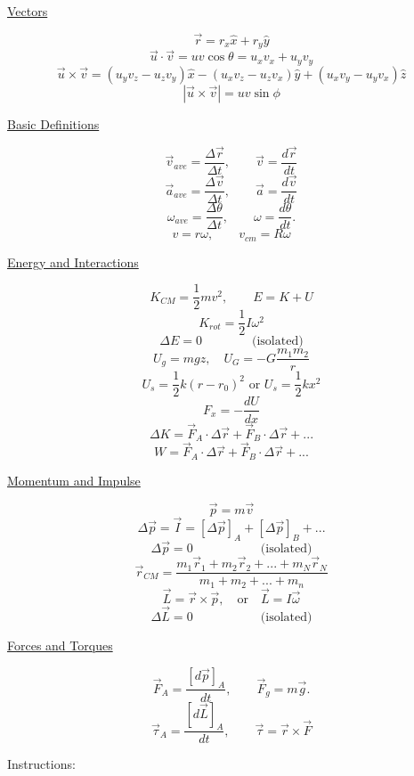 \documentclass[11pt]{exam}
\begin{document}
\begin{minipage}{0.5\textwidth}
  \begin{center}
    \uline{Vectors}
  \end{center}
  \[\vec{r}=r_x\hat{x}+r_y\hat{y}\]
  \[\vec{u}\cdot\vec{v}=uv\cos\theta=u_xv_x+u_yv_y\]
  \[\vec{u}\times\vec{v}=(u_yv_z-u_zv_y)\hat{x}-(u_xv_z-u_zv_x)\hat{y}+(u_xv_y-u_yv_x)\hat{z}\]
  \[|\vec{u}\times \vec{v}|=uv\sin\phi\]
\begin{center}
    \uline{Basic Definitions}
\end{center}
\[\vec{v}_{ave}=\frac{\Delta \vec{r}}{\Delta t},\qquad \vec{v}=\frac{d\vec{r}}{dt}\]
\[\vec{a}_{ave}=\frac{\Delta \vec{v}}{\Delta t},\qquad \vec{a}=\frac{d\vec{v}}{dt}\]
\[\omega_{ave}=\frac{\Delta \theta}{\Delta t},\qquad \omega=\frac{d\theta}{dt}.\]
\[v=r\omega,\qquad v_{cm}=R\omega\]
\begin{center}\uline{Energy and Interactions}\end{center}
\[K_{CM}=\frac{1}{2}mv^2,\qquad E=K+U\]
\[K_{rot}=\frac{1}{2}I\omega^2\]
\[\Delta E=0\qquad\qquad\text{(isolated)}\]
\[U_g=mgz,\quad U_G=-G\frac{m_1m_2}{r}\tag*{(Gravity)}\]
\[U_s=\frac{1}{2}k(r-r_0)^2\text{ or }U_s=\frac{1}{2}kx^2\tag*{(Spring)}\]
\[F_x=-\frac{dU}{dx}\tag*{(Force F)}\]
\[\Delta K=\vec{F}_A\cdot\Delta \vec{r}+\vec{F}_B\cdot \Delta \vec{r}+...\]
\[W=\vec{F}_A\cdot\Delta\vec{r}+\vec{F}_B\cdot\Delta\vec{r}+...\]
\end{minipage}
\begin{minipage}{0.5\textwidth}
\begin{center}\uline{Momentum and Impulse}\end{center}
\[\vec{p}=m\vec{v}\]
\[\Delta \vec{p}=\vec{I}=[\Delta\vec{p}]_A+[\Delta\vec{p}]_B+...\]
\[\Delta \vec{p}=0\qquad\qquad\quad~~\text{(isolated)}\]
\[\vec{r}_{CM}=\frac{m_1\vec{r}_1+m_2\vec{r}_2+...+m_N\vec{r}_N}{m_1+m_2+...+m_n}\]
\[\vec{L}=\vec{r}\times \vec{p},~~~ \text{ or   }~~~ \vec{L}=I\vec{\omega}\]
\[\Delta \vec{L}=0\qquad\qquad\quad~~\text{(isolated)}\]
\begin{center}\uline{Forces and Torques}\end{center}
\[\vec{F}_A=\frac{[d\vec{p}]_A}{dt},\qquad \vec{F}_g=m\vec{g}.\]
\[\vec{\tau}_A=\frac{[d\vec{L}]_A}{dt},\qquad \vec{\tau}=\vec{r}\times \vec{F}\]
\end{minipage}
\newpage



Instructions:\\
\end{document}
